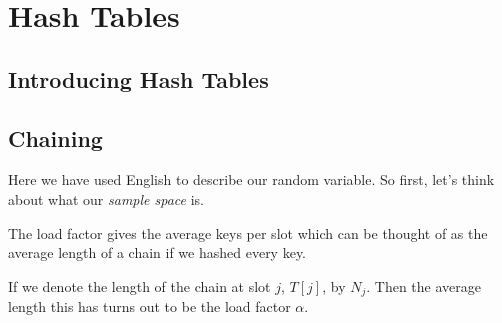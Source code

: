
\chapter{Hash Tables}



\section{Introducing Hash Tables}




\section{Chaining}


Here we have used English to describe our random variable. 
So first, let's think about what our \textit{sample space} is. 




\frmrule 



The load factor gives the average keys per slot 
which can be thought of as the average length of a chain if we hashed 
every key. 

\frmrule 

If we denote the length of the chain at slot $j$, $T[j]$, by $N_j$. 
Then the average length this has turns out to be the load factor $\alpha$. 










